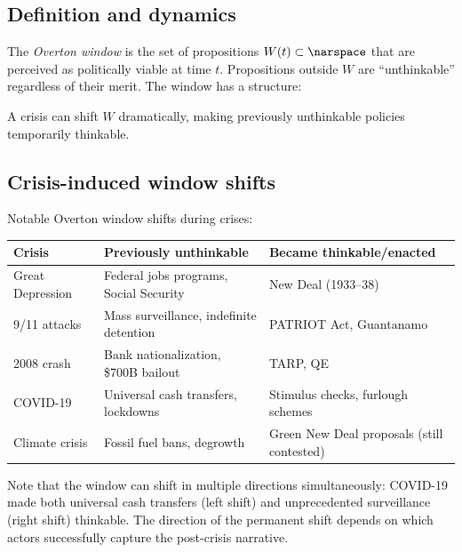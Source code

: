 \subsection{Definition and dynamics}

\begin{definition}
\label{def:overton}
The \emph{Overton window} is the set of propositions $W(t) \subset \narspace$ that are perceived as politically viable at time $t$.
Propositions outside $W$ are ``unthinkable'' regardless of their merit.
The window has a structure:
\begin{center}
\end{center}
A crisis can shift $W$ dramatically, making previously unthinkable policies temporarily thinkable.
\end{definition}

\subsection{Crisis-induced window shifts}

\begin{example}
\label{ex:overton-shifts}
Notable Overton window shifts during crises:

\begin{center}
\begin{tabular}{p{3cm}p{4cm}p{4.5cm}}
\toprule
Crisis & Previously unthinkable & Became thinkable/enacted \\
\midrule
Great Depression & Federal jobs programs, Social Security & New Deal (1933--38) \\[3pt]
9/11 attacks & Mass surveillance, indefinite detention & PATRIOT Act, Guantanamo \\[3pt]
2008 crash & Bank nationalization, \$700B bailout & TARP, QE \\[3pt]
COVID-19 & Universal cash transfers, lockdowns & Stimulus checks, furlough schemes \\[3pt]
Climate crisis & Fossil fuel bans, degrowth & Green New Deal proposals (still contested) \\
\bottomrule
\end{tabular}
\end{center}

Note that the window can shift in multiple directions simultaneously: COVID-19 made both universal cash transfers (left shift) and unprecedented surveillance (right shift) thinkable.
The direction of the permanent shift depends on which actors successfully capture the post-crisis narrative.
\end{example}

